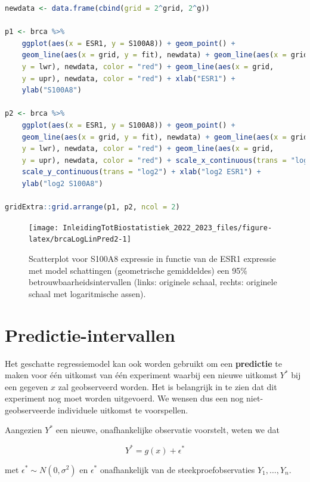 \documentclass[
  12pt,dutch,coursenotes]{book}
\begin{document}
\begin{lstlisting}[language=R]
newdata <- data.frame(cbind(grid = 2^grid, 2^g))

p1 <- brca %>%
    ggplot(aes(x = ESR1, y = S100A8)) + geom_point() +
    geom_line(aes(x = grid, y = fit), newdata) + geom_line(aes(x = grid,
    y = lwr), newdata, color = "red") + geom_line(aes(x = grid,
    y = upr), newdata, color = "red") + xlab("ESR1") +
    ylab("S100A8")

p2 <- brca %>%
    ggplot(aes(x = ESR1, y = S100A8)) + geom_point() +
    geom_line(aes(x = grid, y = fit), newdata) + geom_line(aes(x = grid,
    y = lwr), newdata, color = "red") + geom_line(aes(x = grid,
    y = upr), newdata, color = "red") + scale_x_continuous(trans = "log2") +
    scale_y_continuous(trans = "log2") + xlab("log2 ESR1") +
    ylab("log2 S100A8")

gridExtra::grid.arrange(p1, p2, ncol = 2)
\end{lstlisting}

\begin{figure}

{\centering \texttt{[image: InleidingTotBiostatistiek\_2022\_2023\_files/figure-latex/brcaLogLinPred2-1]} 

}

\caption{Scatterplot voor S100A8 expressie in functie van de ESR1 expressie met model schattingen (geometrische gemiddeldes) een 95$\%$ betrouwbaarheidsintervallen (links: originele schaal, rechts: originele schaal met logaritmische assen).}\label{fig:brcaLogLinPred2}
\end{figure}

\hypertarget{predictie-intervallen}{%
\section{Predictie-intervallen}\label{predictie-intervallen}}

Het geschatte regressiemodel kan ook worden gebruikt om een \textbf{predictie} te maken voor één uitkomst van één experiment waarbij een nieuwe uitkomst \(Y^*\) bij een gegeven \(x\) zal geobserveerd worden. Het is belangrijk in te zien dat dit experiment nog moet worden uitgevoerd. We wensen dus een nog niet-geobserveerde individuele uitkomst te voorspellen.

Aangezien \(Y^*\) een nieuwe, onafhankelijke observatie voorstelt, weten we dat

\[
  Y^* = g(x) + \epsilon^*
\]

met \(\epsilon^*\sim N(0,\sigma^2)\) en \(\epsilon^*\) onafhankelijk van de steekproefobservaties \(Y_1,\ldots, Y_n\).
\end{document}
